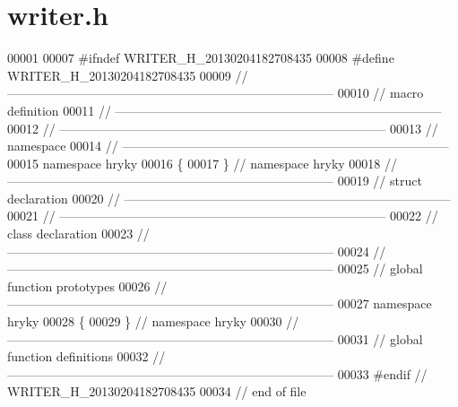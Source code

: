 \hypertarget{writer_8h_source}{\section{writer.\-h}
}

\begin{DoxyCode}
00001 
00007 \textcolor{preprocessor}{#ifndef WRITER\_H\_20130204182708435}
00008 \textcolor{preprocessor}{}\textcolor{preprocessor}{#define WRITER\_H\_20130204182708435}
00009 \textcolor{preprocessor}{}\textcolor{comment}{//
      ------------------------------------------------------------------------------}
00010 \textcolor{comment}{// macro definition}
00011 \textcolor{comment}{//
      ------------------------------------------------------------------------------}
00012 \textcolor{comment}{//
      ------------------------------------------------------------------------------}
00013 \textcolor{comment}{// namespace}
00014 \textcolor{comment}{//
      ------------------------------------------------------------------------------}
00015 \textcolor{keyword}{namespace }hryky
00016 \{
00017 \} \textcolor{comment}{// namespace hryky}
00018 \textcolor{comment}{//
      ------------------------------------------------------------------------------}
00019 \textcolor{comment}{// struct declaration}
00020 \textcolor{comment}{//
      ------------------------------------------------------------------------------}
00021 \textcolor{comment}{//
      ------------------------------------------------------------------------------}
00022 \textcolor{comment}{// class declaration}
00023 \textcolor{comment}{//
      ------------------------------------------------------------------------------}
00024 \textcolor{comment}{//
      ------------------------------------------------------------------------------}
00025 \textcolor{comment}{// global function prototypes}
00026 \textcolor{comment}{//
      ------------------------------------------------------------------------------}
00027 \textcolor{keyword}{namespace }hryky
00028 \{
00029 \} \textcolor{comment}{// namespace hryky}
00030 \textcolor{comment}{//
      ------------------------------------------------------------------------------}
00031 \textcolor{comment}{// global function definitions}
00032 \textcolor{comment}{//
      ------------------------------------------------------------------------------}
00033 \textcolor{preprocessor}{#endif // WRITER\_H\_20130204182708435}
00034 \textcolor{preprocessor}{}\textcolor{comment}{// end of file}
\end{DoxyCode}
